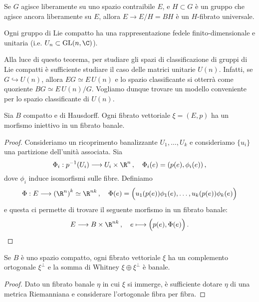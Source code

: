 \begin{oss}
	Se $G$ agisce liberamente su uno spazio contraibile $E$,
	e $H \subset G$ è un gruppo che agisce ancora liberamente su $E$,
	allora $E \to E/H = BH$ è un $H$-fibrato universale.
\end{oss}

\begin{thm}\label{Peter-Weyl}
	Ogni gruppo di Lie compatto ha una rappresentazione fedele finito-dimensionale
	e unitaria (i.e. $U_{n} \subset \mathrm{GL}(n,\C)$).
\end{thm}

Alla luce di questo teorema, per studiare gli spazi di classificazione
di gruppi di Lie compatti è sufficiente studiare
il caso delle matrici unitarie $U(n)$. Infatti,
se $G \hookrightarrow U(n)$, allora $EG \simeq E\,U(n)$
e lo spazio classificante si otterrà come quoziente $BG \simeq E\,U(n) / G$.
Vogliamo dunque trovare un modello conveniente per lo spazio classificante di $U(n)$.

\begin{lemma}
	Sia $B$ compatto e di Hausdorff. Ogni fibrato vettoriale $\xi = (E,p)$
	ha un morfismo iniettivo in un fibrato banale.
	\begin{proof}
		Consideriamo un ricoprimento banalizzante $U_{1}, \dots, U_{k}$
		e consideriamo $\{ u_{i} \}$ una partizione dell'unità associata.
		Sia 
		\begin{equation*}
			\Phi_{i} : p^{-1}(U_{i}) \longrightarrow U_{i} \times \R^{n}\,,
			\quad \Phi_{i}(e) = (p(e), \phi_{i}(e))\,,
		\end{equation*}
		dove $\phi_{i}$ induce isomorfismi sulle fibre. Definiamo
		\begin{equation*}
			\Phi : E \longrightarrow \left( \R^{n} \right)^{k} \simeq \R^{nk}\,,
			\quad \Phi(e) = \Big( u_{1}(p(e)) \phi_{1}(e), \dots, u_{k}(p(e)) \phi_{k}(e) \Big)
		\end{equation*}
		e questa ci permette di trovare il seguente morfismo in un fibrato banale:
		\begin{equation*}
			E \longrightarrow B \times \R^{nk}\,,
			\quad e \longmapsto \Big( p(e), \Phi(e) \Big)\,.
		\end{equation*}
	\end{proof}
\end{lemma}

\begin{cor}
	Se $B$ è uno spazio compatto, ogni fibrato vettoriale $\xi$
	ha un complemento ortogonale $\xi^{\perp}$ e la somma
	di Whitney $\xi \oplus \xi^{\perp}$ è banale.
	\begin{proof}
		Dato un fibrato banale $\eta$ in cui $\xi$ si immerge,
		è sufficiente dotare $\eta$ di una metrica Riemanniana e 
		considerare l'ortogonale fibra per fibra.
	\end{proof}
\end{cor}


